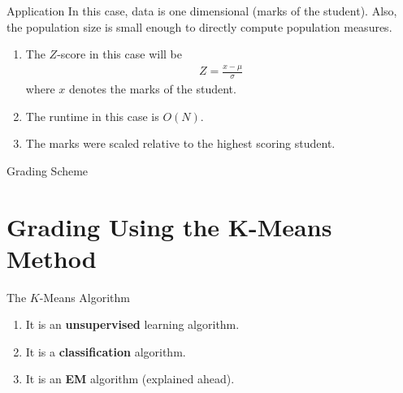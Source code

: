 \documentclass{beamer}
\providecommand{\brak}[1]{\ensuremath{\left(#1\right)}}
\theoremstyle{remark}
\begin{document}
\begin{frame}{Application}
    In this case, data is one dimensional (marks of the student). Also, the
    population size is small enough to directly compute population measures.
    \begin{enumerate}
        \item The $Z$-score in this case will be
            \begin{align}
                Z = \frac{x-\mu}{\sigma}
                \label{eq:Z-score-app}
            \end{align}
        where $x$ denotes the marks of the student.
        \item The runtime in this case is $O\brak{N}$.
        \item The marks were scaled relative to the highest scoring student.
    \end{enumerate}
\end{frame}

\begin{frame}{Grading Scheme}
    \begin{table}[!ht]
        \centering
        
        \caption{Grading scheme used for calculation of $Z$-scores}
        \label{tab:grade-scheme}
    \end{table}
\end{frame}

\section{Grading Using the K-Means Method}
\begin{frame}{The $K$-Means Algorithm}
    \begin{enumerate}
        \item It is an \textbf{unsupervised} learning algorithm.
        \item It is a \textbf{classification} algorithm.
        \item It is an \textbf{EM} algorithm (explained ahead).
    \end{enumerate}
\end{frame}
\end{document}
